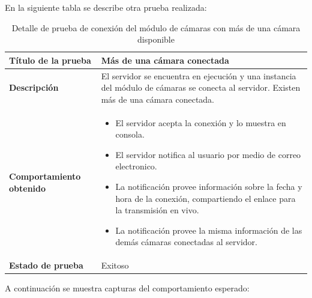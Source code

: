 En la siguiente tabla se describe otra prueba realizada:\\

\begin{table}[H]
    \caption{Detalle de prueba de conexión del módulo de cámaras con más de una cámara disponible}
    \begin{center}
        \begin{tabular}{|>{\centering}p{}|m{}<{\centering}|} 
            \hline
            \textbf{Título de la prueba} & Más de una cámara conectada \\
            \hline
            \textbf{Descripción} & El servidor se encuentra en ejecución y una instancia del módulo de cámaras se conecta al servidor. Existen más de una cámara conectada.\\
            \hline
            \textbf{Comportamiento obtenido} & 
            \begin{itemize}
                \item El servidor acepta la conexión y lo muestra en consola.
                \item El servidor notifica al usuario por medio de correo electronico.
                \item La notificación provee información sobre la fecha y hora de la conexión, compartiendo el enlace para la transmisión en vivo.
                \item La notificación provee la misma información de las demás cámaras conectadas al servidor.
            \end{itemize} \\ 
            \hline
            \textbf{Estado de prueba} & Exitoso \\
            \hline
        \end{tabular}
    \end{center}
\end{table}

A continuación se muestra capturas del comportamiento esperado:

